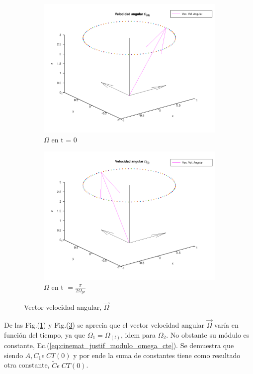\documentclass[oneside,a4paper,english,links]{amca}
\begin{document}
\begin{figure}[h]
\begin{subfigure}{.55\textwidth}
  \centering
  \includegraphics[width=.77\linewidth]{Figuras/omega_t0.png}
  \caption{$\Omega$ en  t = 0}
\label{fig:cinemat_omega_vectorial_t=0}
\end{subfigure}
\begin{subfigure}{.55\textwidth}
  \centering
  \includegraphics[width=.77\linewidth]{Figuras/omega_t_pi_2omega_prec.png}
  \caption{$\Omega$ en t $=\frac{\pi}{2\Omega_{pr}}$}
\label{fig:cinemat_omega_vectorial_t=pi/(2omega_pr)}
\end{subfigure}
\caption{Vector velocidad angular, $\vec{\Omega}$}
\end{figure}

De las Fig.(\ref{fig:cinemat_omega_vectorial_t=0}) y Fig.(\ref{fig:cinemat_omega_vectorial_t=pi/(2omega_pr)}) se aprecia que el vector velocidad angular $\vec{\Omega}$ var\'ia en funci\'on del tiempo, ya que $\Omega_1=\Omega_{(t)}$, idem para $\Omega_2$. No obstante su m\'odulo es constante, Ec.(\ref{eq:cinemat_justif_modulo_omega_cte}). Se demuestra que siendo $A,C_1 \epsilon\; CT(0)$ y por ende la suma de constantes tiene como resultado otra constante, $\tilde{C}\epsilon\; CT(0)$.
\end{document}
